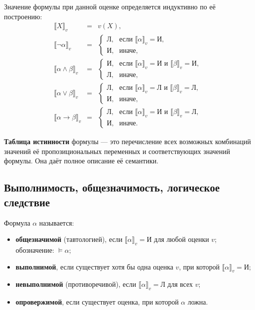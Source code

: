 \documentclass[10pt]{article}
\begin{document}
Значение формулы при данной оценке определяется индуктивно по её построению:
\[
\begin{array}{lcl}
\llbracket X \rrbracket_v &=& v(X),\\
\llbracket \neg\alpha \rrbracket_v &=& \begin{cases}
\textit{Л}, & \text{если } \llbracket\alpha\rrbracket_v = \textit{И},\\
\textit{И}, & \text{иначе},
\end{cases}\\[4mm]
\llbracket \alpha\land\beta \rrbracket_v &=& \begin{cases}
\textit{И}, & \text{если } \llbracket\alpha\rrbracket_v = \textit{И}\text{ и } \llbracket\beta\rrbracket_v = \textit{И},\\
\textit{Л}, & \text{иначе},
\end{cases}\\[4mm]
\llbracket \alpha\lor\beta \rrbracket_v &=& \begin{cases}
\textit{Л}, & \text{если } \llbracket\alpha\rrbracket_v = \textit{Л}\text{ и } \llbracket\beta\rrbracket_v = \textit{Л},\\
\textit{И}, & \text{иначе},
\end{cases}\\[4mm]
\llbracket \alpha\to\beta \rrbracket_v &=& \begin{cases}
\textit{Л}, & \text{если } \llbracket\alpha\rrbracket_v = \textit{И}\text{ и } \llbracket\beta\rrbracket_v = \textit{Л},\\
\textit{И}, & \text{иначе}.
\end{cases}
\end{array}
\]

\textbf{Таблица истинности} формулы — это перечисление всех возможных комбинаций значений её пропозициональных переменных и соответствующих значений формулы. Она даёт полное описание её семантики.

\subsection{Выполнимость, общезначимость, логическое следствие}
\begin{definition}
Формула \(\alpha\) называется:
\begin{itemize}
\item \textbf{общезначимой} (тавтологией), если \(\llbracket\alpha\rrbracket_v = \textit{И}\) для любой оценки \(v\); обозначение: \(\models \alpha\);
\item \textbf{выполнимой}, если существует хотя бы одна оценка \(v\), при которой \(\llbracket\alpha\rrbracket_v = \textit{И}\);
\item \textbf{невыполнимой} (противоречивой), если \(\llbracket\alpha\rrbracket_v = \textit{Л}\) для всех \(v\);
\item \textbf{опровержимой}, если существует оценка, при которой \(\alpha\) ложна.
\end{itemize}
\end{definition}
\end{document}
